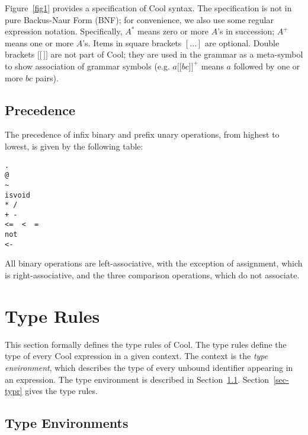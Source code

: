 \documentclass[11pt]{article}
\newcommand{\lbk}{\lbrack\!\lbrack}
\newcommand{\rbk}{\rbrack\!\rbrack}
\begin{document}


Figure~\ref{fig1} provides a specification of Cool syntax.  The
specification is not in pure Backus-Naur Form (BNF); for convenience,
we also use some regular expression notation.  Specifically,
$A^{\ast}$ means zero or more $A$'s in succession; $A^+$ means one or
more $A$'s.
Items in
square brackets $[\ldots]$ are optional.  Double brackets $\lbk \, \rbk$
are not part of Cool; they are used in the grammar as a meta-symbol to
show association of grammar symbols (e.g. $a \lbk b c \rbk ^ {+}$
means $a$ followed by one or more $bc$ pairs).

\subsection{Precedence}
The precedence of infix binary and prefix unary operations, 
from highest to lowest, is given by
the following table:
\begin{verbatim}
.
@
~
isvoid
* /
+ -
<=  <  =
not
<-
\end{verbatim}
All binary operations are left-associative, with the exception of 
assignment, which is right-associative, and the three comparison operations,
which do not associate.

\section{Type Rules}
\label{sec-typrules}

This section formally defines the type rules of Cool.
The type rules define the type of every Cool expression 
in a given context.  The context is the {\em type environment},
which describes the type of every unbound identifier appearing in an
expression.  The type environment is described in Section~\ref{sec-typenv}.
Section~\ref{sec-typr} gives the type rules.

\subsection{Type Environments}
\label{sec-typenv}
\end{document}

